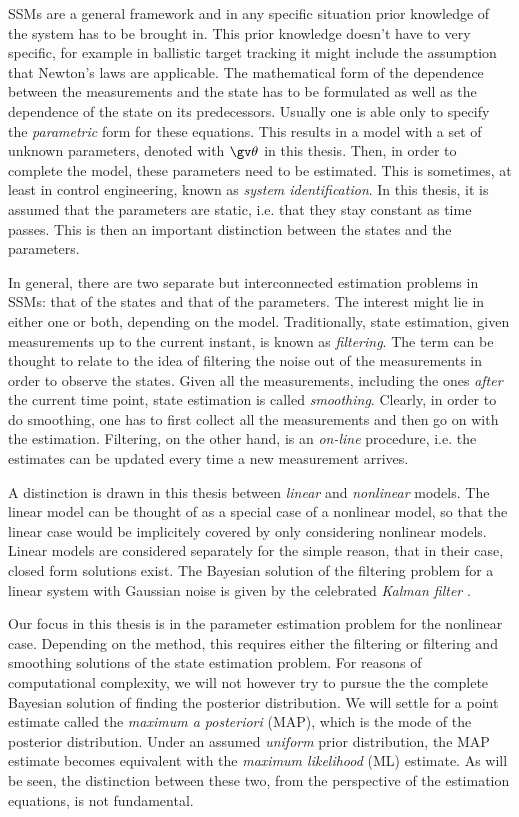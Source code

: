 SSMs are a general framework and in any specific situation prior knowledge of the
system has to be brought in. This prior knowledge doesn't have to very specific,
for example in ballistic target tracking it might include the assumption that Newton's
laws are applicable. The mathematical form of the dependence
between the measurements and the state has to be formulated as well as the dependence
of the state on its predecessors. Usually one is able only to specify the 
\emph{parametric} form for these equations. This results in a model with a set
of unknown parameters, denoted with $\Th$ in this thesis. Then, in order
to complete the model, these parameters need to be estimated. This is sometimes, at least
in control engineering, known as \emph{system identification}. In this thesis,
it is assumed that the parameters are static, i.e. that they stay constant
as time passes. This is then an important distinction between the states and
the parameters.

In general, there are two separate but interconnected estimation problems
in SSMs: that of the states and that of the parameters. The interest might
lie in either one or both, depending on the model. Traditionally, state
estimation, given measurements up to the current instant, is known as \emph{filtering}.
The term can be thought to relate to the idea of filtering the noise out of the measurements
in order to observe the states. Given all the measurements, including the ones
\emph{after} the current time point, state estimation is called \emph{smoothing}.
Clearly, in order to do smoothing, one has to first collect all the measurements
and then go on with the estimation. Filtering, on the other hand, is an \emph{on-line}
procedure, i.e. the estimates can be updated every time a new measurement arrives.

A distinction is drawn in this thesis between \emph{linear} and \emph{nonlinear}
models. The linear model can be thought of as a special case of a nonlinear model,
so that the linear case would be implicitely covered by only considering nonlinear models.
Linear models are considered separately for the simple reason, that in their case, closed
form solutions exist. The Bayesian solution of the filtering problem for a linear system
with Gaussian noise is given by the celebrated \emph{Kalman filter} \parencite{Kalman1960}.

Our focus in this thesis is in the parameter estimation problem for the nonlinear case.
Depending on the method, this requires either the filtering or filtering and smoothing
solutions of the state estimation problem. For reasons of computational complexity, we will not however try to pursue
the the complete Bayesian solution of finding the posterior distribution. We will settle
for a point estimate called the \emph{maximum a posteriori} (MAP), which is the mode
of the posterior distribution. Under an assumed \emph{uniform} prior distribution,
the MAP estimate becomes equivalent with the \emph{maximum likelihood} (ML) estimate.
As will be seen, the distinction between these two, from the perspective of the
estimation equations, is not fundamental.

